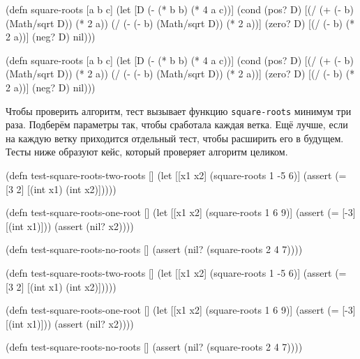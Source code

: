 
\ifx\devicetype\mobile

\begin{english}
  \begin{clojure}
(defn square-roots [a b c]
  (let [D (- (* b b) (* 4 a c))]
    (cond
      (pos? D)
      [(/ (+ (- b) (Math/sqrt D))
          (* 2 a))
       (/ (- (- b) (Math/sqrt D))
          (* 2 a))]
      (zero? D) [(/ (- b) (* 2 a))]
      (neg? D) nil)))
  \end{clojure}
\end{english}

\else

\begin{english}
  \begin{clojure}
(defn square-roots [a b c]
  (let [D (- (* b b) (* 4 a c))]
    (cond
      (pos? D) [(/ (+ (- b) (Math/sqrt D)) (* 2 a))
                (/ (- (- b) (Math/sqrt D)) (* 2 a))]
      (zero? D) [(/ (- b) (* 2 a))]
      (neg? D) nil)))
  \end{clojure}
\end{english}

\fi


Чтобы проверить алгоритм, тест вызывает функцию \verb|square-roots| минимум три
раза. Подберём параметры так, чтобы сработала каждая ветка. Ещё лучше, если на
каждую ветку приходится отдельный тест, чтобы расширить его в будущем. Тесты ниже
образуют кейс, который проверяет алгоритм целиком.

\ifx\devicetype\mobile

\begin{english}
  \begin{clojure}
(defn test-square-roots-two-roots []
  (let [[x1 x2] (square-roots 1 -5 6)]
    (assert
      (= [3 2]
         [(int x1) (int x2)]))))

(defn test-square-roots-one-root []
  (let [[x1 x2] (square-roots 1 6 9)]
    (assert (= [-3] [(int x1)]))
    (assert (nil? x2))))

(defn test-square-roots-no-roots []
  (assert (nil? (square-roots 2 4 7))))
  \end{clojure}
\end{english}

\else

\begin{english}
  \begin{clojure}
(defn test-square-roots-two-roots []
  (let [[x1 x2] (square-roots 1 -5 6)]
    (assert (= [3 2] [(int x1) (int x2)]))))

(defn test-square-roots-one-root []
  (let [[x1 x2] (square-roots 1 6 9)]
    (assert (= [-3] [(int x1)]))
    (assert (nil? x2))))

(defn test-square-roots-no-roots []
  (assert (nil? (square-roots 2 4 7))))
  \end{clojure}
\end{english}

